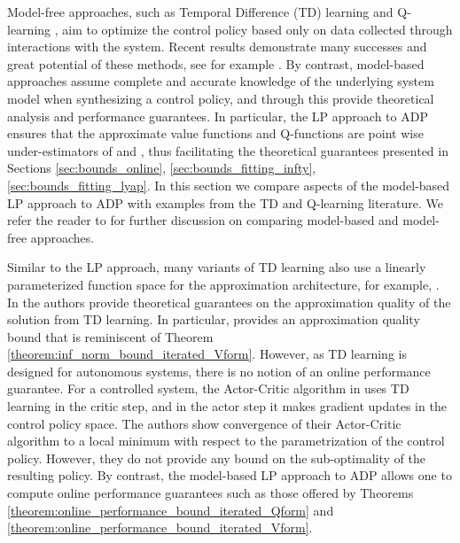 \documentclass[journal]{IEEEtran}
\newcommand{\textQ}{Q}
\begin{document}
Model-free approaches, such as Temporal Difference (TD) learning \cite{sutton_1988_TDlearning} and \textQ-learning \cite{watkins_1989_learningFromDelayedRewards}, aim to optimize the control policy based only on data collected through interactions with the system.
Recent results demonstrate many successes and great potential of these methods, see for example \cite{reviewer_suggestion_2016_modelfree,google_2015_atari,reviewer_suggestion_2018_Qlearning_experience_replay,meyn_2017_zap_qlearning,reviewer_suggestion_2017_policy_gradient,google_2017_alphago}.
By contrast, model-based approaches assume complete and accurate knowledge of the underlying system model when synthesizing a control policy, and through this provide theoretical analysis and performance guarantees.
In particular, the LP approach to ADP ensures that the approximate value functions and \textQ-functions are point wise under-estimators of  and , thus facilitating the theoretical guarantees presented in Sections \ref{sec:bounds_online}, \ref{sec:bounds_fitting_infty}, \ref{sec:bounds_fitting_lyap}.
In this section we compare aspects of the model-based LP approach to ADP with examples from the TD and \textQ-learning literature.
We refer the reader to \cite[Chapter 8]{sutton_2018_rlbook} for further discussion on comparing model-based and model-free approaches.




Similar to the LP approach, many variants of TD learning also use a linearly parameterized function space for the approximation architecture, for example,  \cite{sutton_1988_TDlearning,bradtke_1996_lstd,boyan_2002_lstd}. In \cite{tsitsiklis_1997_TD_analysis} the authors provide theoretical guarantees on the approximation quality of the solution from TD learning. In particular, \cite[Theorem 1]{tsitsiklis_1997_TD_analysis} provides an approximation quality bound that is reminiscent of Theorem \ref{theorem:inf_norm_bound_iterated_Vform}. However, as TD learning is designed for autonomous systems, there is no notion of an online performance guarantee.
For a controlled system, the Actor-Critic algorithm in \cite{konda_2003_actorcritic_journal} uses TD learning in the critic step, and in the actor step it makes gradient updates in the control policy space. The authors show convergence of their Actor-Critic algorithm to a local minimum with respect to the parametrization of the control policy. However, they do not provide any bound on the sub-optimality of the resulting policy.
By contrast, the model-based LP approach to ADP allows one to compute online performance guarantees such as those offered by Theorems \ref{theorem:online_performance_bound_iterated_Qform} and \ref{theorem:online_performance_bound_iterated_Vform}.
\end{document}
